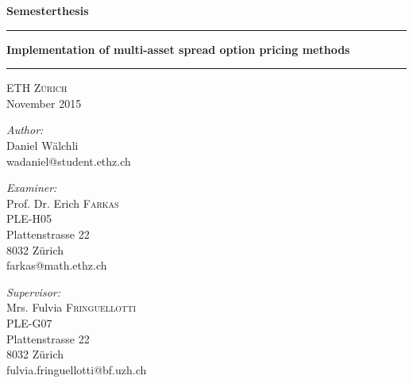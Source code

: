 \documentclass[a4paper]{article}
\begin{document}
\begin{titlepage}
\begin{center}

\large \textbf{Semesterthesis}

\vspace{1cm}
\hrule
\vspace{0.4cm}
\huge \textbf{Implementation of multi-asset spread option pricing methods}\\
\vspace{0.4cm}
\hrule
\vspace{0.4cm}
\textsc{\large ETH Z\"urich}\\
\vspace{0.4cm}
\large {November 2015}

\vspace{6cm}




\vspace{4cm}
\large \emph{Author:}\\
\large Daniel W\"alchli\\
\large wadaniel@student.ethz.ch\\
\vspace{1cm}
\noindent
\begin{minipage}{0.4\textwidth}
\begin{flushleft} \normalsize
\emph{Examiner:}\\
Prof. Dr. Erich \textsc{Farkas}\\
PLE-H05\\
Plattenstrasse 22\\
8032 Z\"urich\\
farkas@math.ethz.ch
\end{flushleft}
\end{minipage}%
\begin{minipage}{0.4\textwidth}
\begin{flushright} \normalsize
\emph{Supervisor:} \\
Mrs. Fulvia \textsc{Fringuellotti}\\
PLE-G07\\
Plattenstrasse 22\\
8032 Z\"urich\\
fulvia.fringuellotti@bf.uzh.ch
\end{flushright}
\end{minipage}

\end{center}
\end{titlepage}

\end{document}
